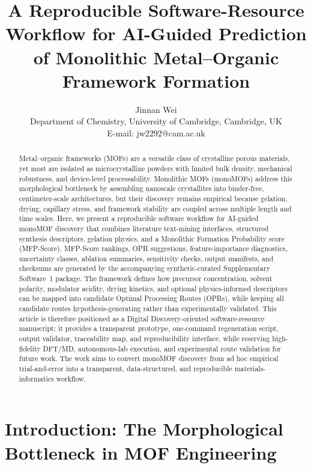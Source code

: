 \documentclass[12pt,a4paper]{article}
\title{A Reproducible Software-Resource Workflow for AI-Guided Prediction of Monolithic Metal--Organic Framework Formation}
\author{Jinnan Wei\\
Department of Chemistry, University of Cambridge, Cambridge, UK\\
E-mail: jw2292@cam.ac.uk}
\date{}
\begin{document}
\maketitle

\begin{abstract}
Metal--organic frameworks (MOFs) are a versatile class of crystalline porous materials, yet most are isolated as microcrystalline powders with limited bulk density, mechanical robustness, and device-level processability. Monolithic MOFs (monoMOFs) address this morphological bottleneck by assembling nanoscale crystallites into binder-free, centimeter-scale architectures, but their discovery remains empirical because gelation, drying, capillary stress, and framework stability are coupled across multiple length and time scales. Here, we present a reproducible software workflow for AI-guided monoMOF discovery that combines literature text-mining interfaces, structured synthesis descriptors, gelation physics, and a Monolithic Formation Probability score (MFP-Score). MFP-Score rankings, OPR suggestions, feature-importance diagnostics, uncertainty classes, ablation summaries, sensitivity checks, output manifests, and checksums are generated by the accompanying synthetic-curated Supplementary Software~1 package. The framework defines how precursor concentration, solvent polarity, modulator acidity, drying kinetics, and optional physics-informed descriptors can be mapped into candidate Optimal Processing Routes (OPRs), while keeping all candidate routes hypothesis-generating rather than experimentally validated. This article is therefore positioned as a Digital Discovery-oriented software-resource manuscript: it provides a transparent prototype, one-command regeneration script, output validator, traceability map, and reproducibility interface, while reserving high-fidelity DFT/MD, autonomous-lab execution, and experimental route validation for future work. The work aims to convert monoMOF discovery from ad hoc empirical trial-and-error into a transparent, data-structured, and reproducible materials-informatics workflow.
\end{abstract}



\section{Introduction: The Morphological Bottleneck in MOF Engineering}
\end{document}
